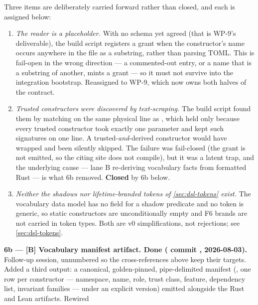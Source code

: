 \begin{enumerate}[leftmargin=2.2em, itemsep=0.35em]
  Three items are deliberately carried forward rather than closed, and
  each is assigned below:
  \begin{enumerate}[label=(\alph*), leftmargin=1.6em, topsep=0.2em]
  \item \emph{The  reader is a placeholder.} With no
    schema yet agreed (that is WP-9's deliverable), the build script
    registers a grant when the constructor's name occurs anywhere in
    the file as a substring, rather than parsing TOML. This is
    fail-open in the wrong direction --- a commented-out entry, or a
    name that is a substring of another, mints a grant --- so it must
    not survive into the integration bootstrap. Reassigned to WP-9,
    which now owns both halves of the contract.
  \item \emph{Trusted constructors were discovered by text-scraping.}
    The build script found them by matching
     on the same physical line as
    , which held only because every trusted constructor
    took exactly one parameter and  kept such
    signatures on one line. A trusted-\emph{and}-derived constructor
    would have wrapped and been silently skipped. The failure was
    fail-closed (the grant is not emitted, so the citing site does not
    compile), but it was a latent trap, and the underlying cause ---
    lane B re-deriving vocabulary facts from formatted Rust --- is what
    6b removed. \textbf{Closed} by 6b below.
  \item \emph{Neither the  shadows nor
    lifetime-branded tokens of \cref{sec:dsl-tokens} exist.} The
    vocabulary data model has no field for a shadow predicate and no
    token is generic, so static constructors are unconditionally empty
    and F6 brands are not carried in token types. Both are v0
    simplifications, not rejections; see \cref{sec:dsl-tokens}.
  \end{enumerate}
  \smallskip
  \noindent\textbf{6b --- [B] Vocabulary manifest artifact. \textbf{Done}
  ( commit , 2026-08-03).} Follow-up
  session, unnumbered so the cross-references above keep their
  targets. Added a third  output: a canonical,
  golden-pinned, pipe-delimited manifest
  (, one row per constructor ---
  namespace, name, role, trust class,  feature, dependency
  list, invariant families --- under an explicit 
  version) emitted alongside the Rust and Lean artifacts. Rewired

\end{enumerate}
